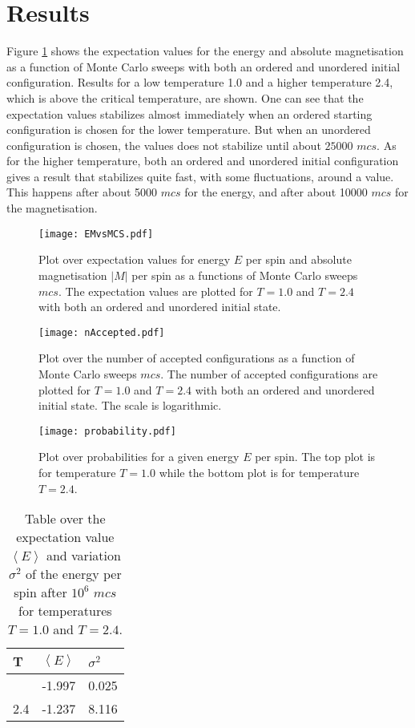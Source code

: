 \section{Results}
\label{sec:results}
Figure \ref{fig:EMvsMCS} shows the expectation values for the energy and absolute magnetisation as a function of Monte Carlo sweeps with both an ordered and unordered initial configuration. Results for a low temperature 1.0 and a higher temperature 2.4, which is above the critical temperature, are shown. One can see that the expectation values stabilizes almost immediately when an ordered starting configuration is chosen for the lower temperature. But when an unordered configuration is chosen, the values does not stabilize until about $25000$ $mcs$. As for the higher temperature, both an ordered and unordered initial configuration gives a result that stabilizes quite fast, with some fluctuations, around a value. This happens after about 5000 $mcs$ for the energy, and after about 10000 $mcs$ for the magnetisation.   
\begin{figure}[htbp]
	\centering
	\texttt{[image: EMvsMCS.pdf]}
	\caption{Plot over expectation values for energy $E$ per spin and absolute magnetisation $|M|$ per spin as a functions of Monte Carlo sweeps $mcs$. The expectation values are plotted for $T=1.0$ and $T=2.4$ with both an ordered and unordered initial state.}
	\label{fig:EMvsMCS}
\end{figure}

\begin{figure}[htbp]
	\centering
	\texttt{[image: nAccepted.pdf]}
	\caption{Plot over the number of accepted configurations as a function of Monte Carlo sweeps $mcs$. The number of accepted configurations are plotted for $T=1.0$ and $T=2.4$ with both an ordered and unordered initial state. The scale is logarithmic.}
	\label{fig:nAccepted}
\end{figure}

\begin{figure}[htbp]
	\centering
	\texttt{[image: probability.pdf]}
	\caption{Plot over probabilities for a given energy $E$ per spin. The top plot is for temperature $T = 1.0$ while the bottom plot is for temperature $T=2.4$.}
	\label{fig:prob}
\end{figure}

\begin{table}[htbp]
	\centering
	\begin{tabular}{lll}
		T   & $\left\langle E\right\rangle$  & $\sigma^2$ \\
		\hline
		\addlinespace[0.1cm]
		1.0   & -1.997 & 0.025 \\
		2.4 & -1.237  & 8.116
	\end{tabular}
	\caption{Table over the expectation value  $\left\langle E\right\rangle$ and variation  $\sigma^2$ of the energy per spin after $10^6$ $mcs$ for temperatures $T=1.0$ and $T=2.4$.}
	\label{tab:prob}
\end{table}

